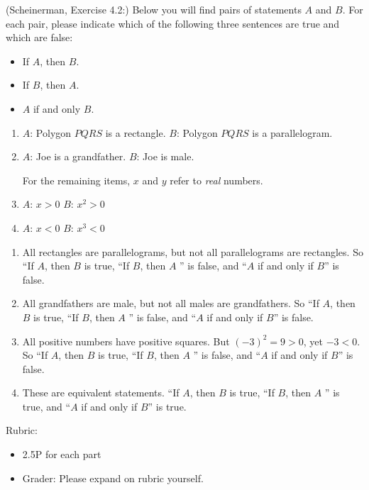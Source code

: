 \documentclass{article}
\theoremstyle{definition}
\begin{document}
\begin{question}
   (Scheinerman, Exercise 4.2:)
    Below you will find pairs of statements $A$ and $B$. For each pair, please indicate which
of the following three sentences are true and which are false:
    \begin{itemize}
        \item If $A$, then $B$.
        \item If $B$, then $A$.
        \item $A$ if and only $B$.
    \end{itemize}
    \begin{enumerate}
        \item $A$: Polygon $PQRS$ is a rectangle. 
              $B$: Polygon $PQRS$ is a parallelogram.
        \item $A$: Joe is a grandfather.
              $B$: Joe is male.

         For the remaining items, $x$ and $y$ refer to \emph{real} numbers.

         \item $A$: $x>0$
               $B$: $x^2>0$
         \item $A$: $x<0$
               $B$: $x^3<0$
               
    \end{enumerate}
\end{question}
\begin{solution}
    \begin{enumerate}
        \item All rectangles are parallelograms, but not all parallelograms are rectangles.
              So ``If $A$, then $B$ is true, ``If $B$, then $A$ '' is false, and ``$A$ if and only if $B$'' is false.
        \item All grandfathers are male, but not all males are grandfathers.
              So ``If $A$, then $B$ is true, ``If $B$, then $A$ '' is false, and ``$A$ if and only if $B$'' is false.   
                       \item All positive numbers have positive squares.  But $(-3)^2 = 9 > 0$, yet $-3 < 0$.
              So ``If $A$, then $B$ is true, ``If $B$, then $A$ '' is false, and ``$A$ if and only if $B$'' is false.
         \item These are equivalent statements.
              ``If $A$, then $B$ is true, ``If $B$, then $A$ '' is true, and ``$A$ if and only if $B$'' is true.   
       \end{enumerate}
       
{\color{red} Rubric:
\begin{itemize}
\item 2.5P for each part
\item Grader: Please expand on rubric yourself.
\end{itemize}}
\end{solution}
\end{document}
